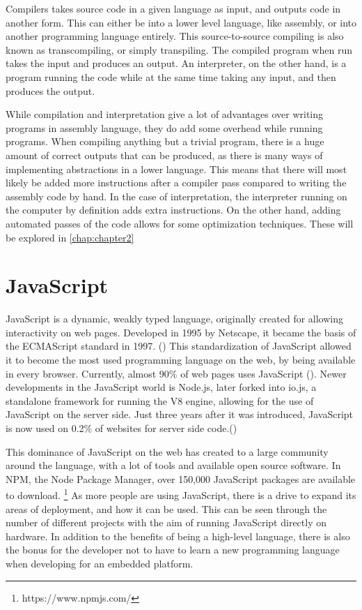 Compilers takes source code in a given language as input, and outputs code in another form. This can either be into a lower level language, like assembly, or into another programming language entirely.
This source-to-source compiling is also known as transcompiling, or simply transpiling.
The compiled program when run takes the input and produces an output. 
An interpreter, on the other hand, is a program running the code while at the same time taking any input, and then produces the output.

While compilation and interpretation give a lot of advantages over writing programs in assembly language, they do add some overhead while running programs.
When compiling anything but a trivial program, there is a huge amount of correct outputs that can be produced, as there is many ways of implementing abstractions in a lower language.
This means that there will most likely be added more instructions after a compiler pass compared to writing the assembly code by hand.
In the case of interpretation, the interpreter running on the computer by definition adds extra instructions. 
On the other hand, adding automated passes of the code allows for some optimization techniques.
These will be explored in \cref{chap:chapter2}

\section{JavaScript}
JavaScript is a dynamic, weakly typed language, originally created for allowing interactivity on web pages.
Developed in 1995 by Netscape, it became the basis of the ECMAScript standard in 1997. (\cite{jshistory})
This standardization of JavaScript allowed it to become the most used programming language on the web, by being available in every browser.
Currently, almost 90\% of web pages uses JavaScript (\cite{jsclientstats}).
Newer developments in the JavaScript world is Node.js, later forked into io.js, a standalone framework for running the V8 engine, allowing for the use of JavaScript on the server side.
Just three years after it was introduced, JavaScript is now used on 0.2\% of websites for server side code.(\cite{jsserverstats})

This dominance of JavaScript on the web has created to a large community around the language, with a lot of tools and available open source software.
In NPM, the Node Package Manager, over 150,000 JavaScript packages are available to download. \footnote{https://www.npmjs.com/}
As more people are using JavaScript, there is a drive to expand its areas of deployment, and how it can be used.
This can be seen through the number of different projects with the aim of running JavaScript directly on hardware.
In addition to the benefits of being a high-level language, there is also the bonus for the developer not to have to learn a new programming language when developing for an embedded platform.

